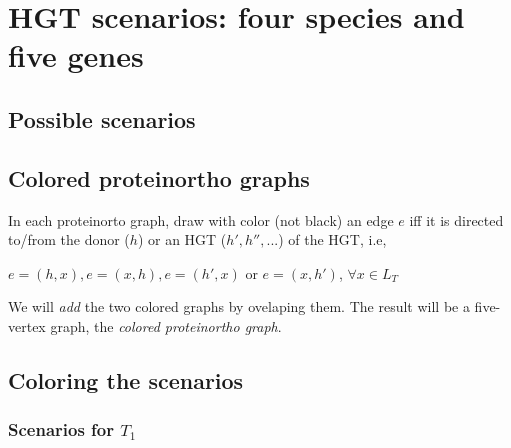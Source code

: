 \documentclass[10pt,a4paper,notitlepage]{article}
\begin{document}
\section{HGT scenarios: four species and five genes}	

\subsection{Possible scenarios}


\subsection{Colored proteinortho graphs}
In each proteinorto graph, draw with color (not black) an edge $e$ iff it is directed to/from the donor ($h$) or an HGT ($h', h'',...$) of the HGT, i.e, 
		\begin{center}
			 $e=(h,x),e=(x,h),e=(h',x)$ or $e=(x,h')$, $\forall x\in L_T$\\
		\end{center}

We will \textit{add} the two colored graphs by ovelaping them. The result will be a five-vertex graph, the \textit{colored proteinortho graph}.


\subsection{Coloring the scenarios}
	\subsubsection{Scenarios for $T_1$}
\end{document}
